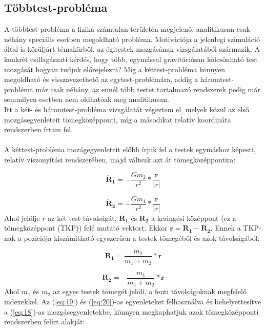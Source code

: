 \begin{multicols}{2}
\subsection{Többtest-probléma}
A többtest-probléma a fizika számtalan területén megjelenő, analitikusan csak néhány speciális esetben megoldható probléma. Motivációja a jelenlegi szimuláció által is körüljárt témakörből, az égitestek mozgásának vizsgálatából származik. A konkrét csillagászati kérdés, hogy több, egymással gravitációsan kölcsönható test mozgását hogyan tudjuk előrejelezni? Míg a kéttest-probléma könnyen megoldható és visszavezethető az egytest-problémára, addig a háromtest-probléma már csak néhány, az ennél több testet tartalmazó rendszerek pedig már semmilyen esetben nem oldhatóak meg analitikusan. \\
Itt a két- és háromtest-probléma vizsgálatát végeztem el, melyek közül az első mozgásegyenleteit tömegközépponti, míg a másodikat relatív koordináta rendszerben írtam fel.
\\ \\
A kéttest-probléma mozágegyenleteit előbb írjuk fel a testek egymáshoz képesti, relatív viszonyítási rendszerében, majd váltsuk azt át tömegközéppontira:

\begin{equation} \label{eq:18}
    \boldsymbol{\ddot{R}_{1}}
    =
    - \frac{G m_{2}}{r^{2}} * \frac{\boldsymbol{r}}{\left| r \right|}
\end{equation}

\begin{equation} \label{eq:19}
    \boldsymbol{\ddot{R}_{2}}
    =
    - \frac{G m_{1}}{r^{2}} * \frac{\boldsymbol{r}}{\left| r \right|}
\end{equation}
Ahol jelölje $r$ az két test távolságát, $\boldsymbol{R_{1}}$ és $\boldsymbol{R_{2}}$ a keringési középpont (ez a tömegközéppont (TKP)) felé mutató vektort. Ekkor $\boldsymbol{r} = \boldsymbol{R_{1}} - \boldsymbol{R_{2}}$. Ennek a TKP-nak a pozíciója kiszámítható egyszerűen a testek tömegéből és azok távolságából:

\begin{equation} \label{eq:20}
    \boldsymbol{R_{1}}
    =
    \frac{m_{2}}{m_{1} + m_{2}} * \boldsymbol{r}
\end{equation}

\begin{equation} \label{eq:21}
    \boldsymbol{R_{2}}
    =
    - \frac{m_{1}}{m_{1} + m_{2}} * \boldsymbol{r}
\end{equation}
Ahol $m_{1}$ és $m_{2}$ az egyes testek tömegét jelöli, a fenti távolságoknak megfelelő indexekkel. Az (\ref{eq:19}) és (\ref{eq:20})-as egyenleteket felhasználva és behelyettesítve a (\ref{eq:18})-as mozgásegyenletekbe, könnyen megkaphatjuk azok tömegközépponti rendszerben felírt alakját:


\end{multicols}
